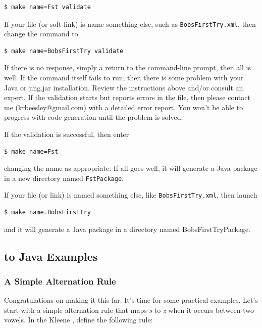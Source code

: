 \begin{Verbatim}
$ make name=Fst validate
\end{Verbatim}

\noindent
If your file (or soft link) is name something else, such as \texttt{BobsFirstTry.xml}, then change the command to

\begin{Verbatim}
$ make name=BobsFirstTry validate
\end{Verbatim}

\noindent
If there is no response, simply a return to the command-line prompt, then all is well.  If the command itself fails to run,
then there is some problem with your Java or jing.jar installation.  Review the instructions above and/or consult an expert.
If the validation starts but reports errors in the \xml{} file, then please contact me (krbeesley@gmail.com) with a detailed
error report.  You won't be able to progress with code generation until the problem is solved.

If the validation is successful, then enter

\begin{Verbatim}
$ make name=Fst
\end{Verbatim}

\noindent
changing the name as appropriate.  If all goes well, it will generate a Java package in a new directory
named \texttt{FstPackage}.

If your \xml{} file (or link) is named something else, like \texttt{BobsFirstTry.xml}, then launch

\begin{Verbatim}
$ make name=BobsFirstTry
\end{Verbatim}

\noindent
and it will generate a Java package in a directory named BobsFirstTryPackage.

\subsection{\fsm{} to Java Examples}

\subsubsection{A Simple Alternation Rule}

Congratulations on making it this far.  It's time for some practical examples.  Let's start with a simple alternation rule
that maps \emph{s} to \emph{z} when it occurs between two vowels.  In the Kleene \gui{}, define the following rule:

